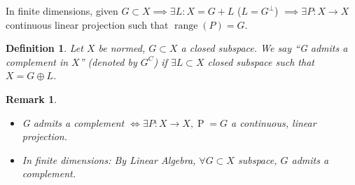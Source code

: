 \documentclass[a4paper]{article}
\newcounter{lecref}[section]
\numberwithin{lecref}{section}
\newtheorem{definition}[lecref]{Definition}
\newtheorem*{Remark}{Remark}
\begin{document}
In finite dimensions, given $G \subset X \implies \exists L: X = G + L$ ($L = G^\bot$) $\implies \exists P: X \to X$ continuous linear projection such that $\operatorname{range}(P) = G$.

\begin{definition}
	\label{definition:7.5}
	Let $X$ be normed, $G \subset X$ a closed subspace. We say \enquote{G admits a complement in $X$} (denoted by $G^C$) if $\exists L \subset X$ closed subspace such that $X = G \oplus L$.
\end{definition}

\begin{Remark}
	\begin{itemize}
		\item G admits a complement $\iff \exists P: X \to X, \operatorname{P} = G$ a continuous, linear projection.
		\item In finite dimensions: By Linear Algebra, $\forall G \subset X$ subspace, $G$ admits a complement.
	\end{itemize}
\end{Remark}

\printindex
\end{document}
